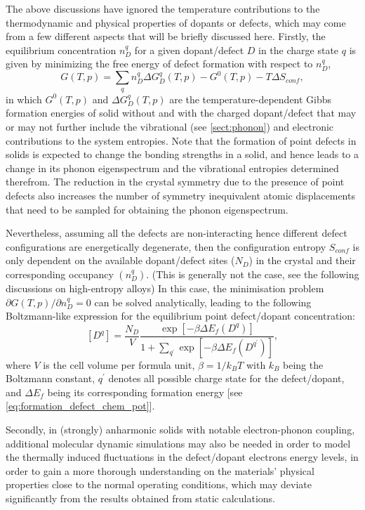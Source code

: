 The above discussions have ignored the temperature contributions to the thermodynamic and physical properties of dopants or defects, which may come from a few different aspects that will be briefly discussed here. Firstly, the equilibrium concentration $n_{D}^{q}$ for a given dopant/defect $D$ in the charge state $q$ is given by minimizing the free energy of defect formation with respect to $n_{D}^{q}$,
\begin{equation*}
    G(T,p)=\sum_{q}n_D^q \Delta G_D^{q}(T,p)-G^{0}(T,p)-T\Delta S_{conf},
\end{equation*}
in which $G^{0}(T,p)$ and $\Delta G_D^{q}(T,p)$ are the temperature-dependent Gibbs formation energies of solid without and with the charged dopant/defect that may or may not further include the vibrational  (see \cref{sect:phonon}) and electronic contributions to the system entropies. Note that the formation of point defects in solids is expected to change the bonding strengths in a solid, and hence leads to a change in its phonon eigenspectrum and the vibrational entropies determined therefrom. The reduction in the crystal symmetry due to the presence of point defects also increases the number of symmetry inequivalent atomic displacements that need to be sampled for obtaining the phonon eigenspectrum.

Nevertheless, assuming all the defects are non-interacting hence different defect configurations are energetically degenerate, then the configuration entropy $S_{conf}$ is only dependent on the available dopant/defect sites ($N_D$) in the crystal and their corresponding occupancy $(n_{D}^{q})$.  (This is generally not the case, see the following discussions on high-entropy alloys) In this case, the minimisation problem $\partial G(T,p)/\partial n_{D}^q=0$ can be solved analytically, leading to the following Boltzmann-like expression for the equilibrium point defect/dopant concentration:\cite{kasamatsu2011theoretical}
\begin{equation*}\label{eq:defect_concentration}
    \left[D^q\right]=\frac{N_{D}}{V}\frac{\exp[-\beta\Delta E_f(D^{q})]}{1+\sum_{q^\prime} \exp[-\beta\Delta E_f(D^{q^\prime})] },
\end{equation*}
where $V$ is the cell volume per formula unit, $\beta=1/k_{B}T$ with $k_{B}$ being the Boltzmann constant, $q^{\prime}$ denotes all possible charge state for the defect/dopant, and $\Delta E_{f}$ being its corresponding formation energy [see \cref{eq:formation_defect_chem_pot}]. 

Secondly, in (strongly) anharmonic solids with notable electron-phonon coupling, additional molecular dynamic simulations may also be needed in order to model the thermally induced fluctuations in the defect/dopant electrons energy levels, in order to gain a more thorough understanding on the materials' physical properties close to the normal operating conditions, which may deviate significantly from the results obtained from static calculations.\cite{cohen2019breakdown,li2019influence,qiao2020extending,chu2020low}


